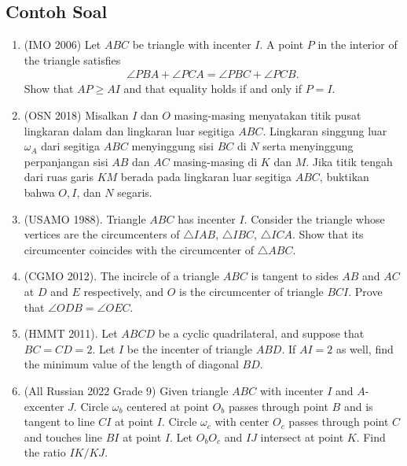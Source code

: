 \documentclass[12pt, letter]{scrartcl}
\begin{document}
\subsection{Contoh Soal}
\begin{enumerate}
\item (IMO 2006) Let $ABC$ be triangle with incenter $I$. A point $P$ in the interior of the triangle satisfies
\begin{align*}
    \angle PBA + \angle PCA = \angle PBC + \angle PCB.
\end{align*}
Show that $AP \ge AI$ and that equality holds if and only if $P=I$.

\item (OSN 2018) Misalkan $I$ dan $O$ masing-masing menyatakan titik pusat lingkaran dalam dan lingkaran luar segitiga $ABC$. Lingkaran singgung luar $\omega_A$ dari segitiga $ABC$ menyinggung sisi $BC$ di $N$ serta menyinggung perpanjangan sisi $AB$ dan $AC$ masing-masing di $K$ dan $M$. Jika titik tengah dari ruas garis $KM$ berada pada lingkaran luar segitiga $ABC$, buktikan bahwa $O,I$, dan $N$ segaris.

\item (USAMO 1988). Triangle $ABC$ has incenter $I$. Consider the triangle whose vertices are the circumcenters of $\triangle IAB$, $\triangle IBC$, $\triangle ICA$. Show that its circumcenter coincides with the circumcenter of $\triangle ABC$.

\item (CGMO 2012). The incircle of a triangle $ABC$ is tangent to sides $AB$ and $AC$ at $D$ and $E$ respectively, and $O$ is the circumcenter of triangle $BCI$. Prove that $\angle ODB = \angle OEC$.

\item (HMMT 2011). Let $ABCD$ be a cyclic quadrilateral, and suppose that $BC = CD = 2$. Let $I$ be the incenter of triangle $ABD$. If $AI = 2$ as well, find the minimum value of the length of diagonal $BD$.

\item (All Russian 2022 Grade 9) Given triangle $ABC$ with incenter $I$ and $A$-excenter $J$. Circle $\omega_b$ centered at point $O_b$ passes through point $B$ and is tangent to line $CI$ at point $I$. Circle $\omega_c$ with center $O_c$ passes through point $C$ and touches line $BI$ at point $I$. Let $O_bO_c$ and $IJ$ intersect at point $K$. Find the ratio $IK/KJ$.
\end{enumerate}
\end{document}
